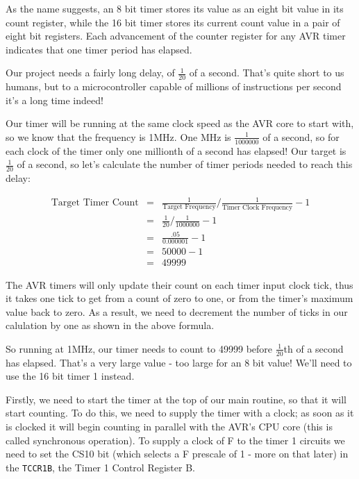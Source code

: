 \documentclass[a4paper,oneside,notitlepage]{book}
\begin{document}
As the name suggests, an 8 bit timer stores its value as an eight bit value in its count register, while the 16 bit timer stores its current count value in a pair of eight bit registers. Each advancement of the counter register for any AVR timer indicates that one timer period has elapsed.

Our project needs a fairly long delay, of \(\frac{1}{20}\) of a second. That's quite short to us humans, but to a microcontroller capable of millions of instructions per second it's a long time indeed!

Our timer will be running at the same clock speed as the AVR core to start with, so we know that the frequency is 1MHz. One MHz is \(\frac{1}{1000000}\) of a second, so for each clock of the timer only one millionth of a second has elapsed! Our target is \(\frac{1}{20}\) of a second, so let's calculate the number of timer periods needed to reach this delay:

\begin{displaymath}
\begin{array}{rcl}
\text{Target Timer Count} & = & \frac{1}{\text{Target Frequency}} / \frac{1}{\text{Timer Clock Frequency}} - 1 \\[6pt]
                          & = & \frac{1}{20} / \frac{1}{1000000} - 1 \\[6pt]
                          & = & \frac{.05}{0.000001} - 1 \\[6pt]
                          & = & 50000 - 1 \\[6pt]
                          & = & 49999
\end{array}
\end{displaymath}

The AVR timers will only update their count on each timer input clock tick, thus it takes one tick to get from a count of zero to one, or from the timer's maximum value back to zero. As a result, we need to decrement the number of ticks in our calulation by one as shown in the above formula.

So running at 1MHz, our timer needs to count to 49999 before \(\frac{1}{20}\)th of a second has elapsed. That's a very large value - too large for an 8 bit value! We'll need to use the 16 bit timer 1 instead.

Firstly, we need to start the timer at the top of our main routine, so that it will start counting. To do this, we need to supply the timer with a clock; as soon as it is clocked it will begin counting in parallel with the AVR's CPU core (this is called synchronous operation). To supply a clock of F to the timer 1 circuits we need to set the CS10 bit (which selects a F prescale of 1 - more on that later) in the \texttt{TCCR1B}, the Timer 1 Control Register B.
\end{document}
